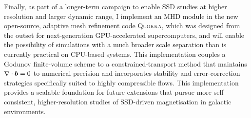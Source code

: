Finally, as part of a longer-term campaign to enable SSD studies at higher resolution and larger dynamic range, I implement an MHD module in the new open-source, adaptive mesh refinement code \textsc{Quokka}, which was designed from the outset for next-generation GPU-accelerated supercomputers, and will enable the possibility of simulations with a much broader scale separation than is currently practical on CPU-based systems. This implementation couples a Godunov finite-volume scheme to a constrained-transport method that maintains $\nabla\cdot\bm{b} = 0$ to numerical precision and incorporates stability and error-correction strategies specifically suited to highly compressible flows. This implementation provides a scalable foundation for future extensions that pursue more self-consistent, higher-resolution studies of SSD-driven magnetisation in galactic environments.
